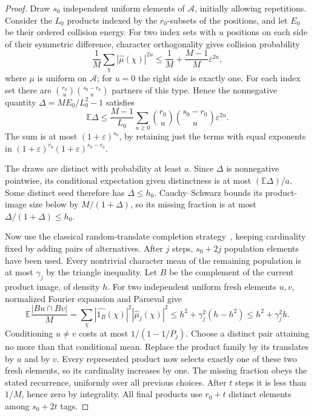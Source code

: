 \begin{proof}
Draw $s_0$ independent uniform elements of $\mathcal A$, initially
allowing repetitions.  Consider the $L_0$ products indexed by the
$r_0$-subsets of the positions, and let $E_0$ be their ordered collision
energy.  For two index sets with $u$ positions on each side of their
symmetric difference, character orthogonality gives collision probability
\[
 \frac1M\sum_\chi|\widehat\mu(\chi)|^{2u}
 \le\frac1M+\frac{M-1}{M}\varepsilon^{2u},
\]
where $\mu$ is uniform on $\mathcal A$; for $u=0$ the right side is
exactly one.  For each index set there are
$\binom{r_0}{u}\binom{s_0-r_0}{u}$ partners of this type.  Hence the
nonnegative quantity $\Delta=ME_0/L_0^2-1$ satisfies
\[
 \mathbb E\Delta\le\frac{M-1}{L_0}
 \sum_{u\ge0}\binom{r_0}{u}\binom{s_0-r_0}{u}\varepsilon^{2u}.
\]
The sum is at most $(1+\varepsilon)^{s_0}$, by retaining just the
terms with equal exponents in
$(1+\varepsilon)^{r_0}(1+\varepsilon)^{s_0-r_0}$.

The draws are distinct with probability at least $a$.  Since $\Delta$
is nonnegative pointwise, its conditional expectation given distinctness
is at most $(\mathbb E\Delta)/a$.  Some distinct seed therefore has
$\Delta\le h_0$.  Cauchy--Schwarz bounds its product-image size below
by $M/(1+\Delta)$, so its missing fraction is at most
$\Delta/(1+\Delta)\le h_0$.

Now use the classical random-translate completion
strategy~\cite[Theorem~2]{erdos-renyi-group}, keeping cardinality fixed
by adding pairs of alternatives.  After $j$ steps, $s_0+2j$ population
elements have been used.  Every nontrivial character mean of the
remaining population is at most $\gamma_j$ by the triangle inequality.
Let $B$ be the complement of the current product image, of density $h$.
For two independent uniform fresh elements $u,v$, normalized Fourier
expansion and Parseval give
\[
 \mathbb E\frac{|Bu\cap Bv|}{M}
 =\sum_\chi|\widehat{1_B}(\chi)|^2
                 |\widehat\mu_j(\chi)|^2
 \le h^2+\gamma_j^2(h-h^2)
 \le h^2+\gamma_j^2h.
\]
Conditioning $u\ne v$ costs at most $1/(1-1/P_j)$.
Choose a distinct pair attaining no more than that conditional mean.
Replace the product family by its translates by $u$ and by $v$.
Every represented product now selects exactly one of these two fresh
elements, so its cardinality increases by one.  The missing fraction
obeys the stated recurrence, uniformly over all previous choices.
After $t$ steps it is less than $1/M$, hence zero by integrality.
All final products use $r_0+t$ distinct elements among $s_0+2t$ tags.
\end{proof}

